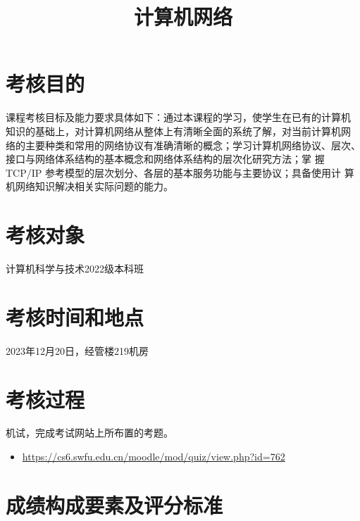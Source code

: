 \documentclass{swfuassessment}
\title{计算机网络}
\begin{document}
\headone{}

\section{考核目的}

课程考核目标及能力要求具体如下：通过本课程的学习，使学生在已有的计算机
知识的基础上，对计算机网络从整体上有清晰全面的系统了解，对当前计算机网
络的主要种类和常用的网络协议有准确清晰的概念；学习计算机网络协议、层次、
接口与网络体系结构的基本概念和网络体系结构的层次化研究方法；掌
握 TCP/IP 参考模型的层次划分、各层的基本服务功能与主要协议；具备使用计
算机网络知识解决相关实际问题的能力。

\section{考核对象}

计算机科学与技术2022级本科班

\section{考核时间和地点}

2023年12月20日，经管楼219机房

\section{考核过程}

机试，完成考试网站上所布置的考题。

\begin{itemize}
\item \url{https://cs6.swfu.edu.cn/moodle/mod/quiz/view.php?id=762}
\end{itemize}

\section{成绩构成要素及评分标准}
\end{document}
